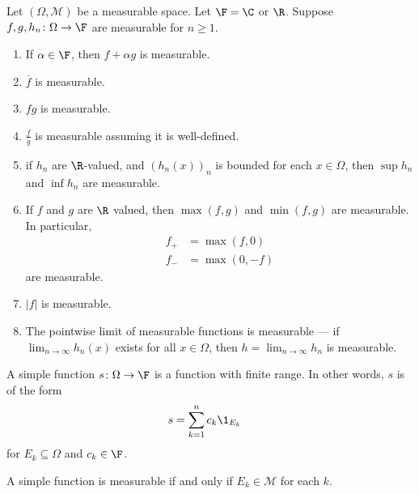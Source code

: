 \begin{proposition}
  Let $\left(\Omega,\mathcal{M}\right)$ be a measurable space. Let $\F = \C$ or $\R$. Suppose $f,g,h_n\colon \Omega\rightarrow \F$ are measurable for $n\geq 1$.
  \begin{enumerate}[(1)]
    \item If $\alpha \in \F$, then $f + \alpha g$ is measurable.
    \item $\overline{f}$ is measurable.
    \item $fg$ is measurable.
    \item $\frac{f}{g}$ is measurable assuming it is well-defined.
    \item if $h_n$ are $\R$-valued, and $\left(h_n\left(x\right)\right)_n$ is bounded for each $x\in \Omega$, then $\sup h_n$ and $\inf h_n$ are measurable.
    \item If $f$ and $g$ are $\R$ valued, then $\max\left(f,g\right)$ and $\min\left(f,g\right)$ are measurable. In particular,
      \begin{align*}
        f_{+} &= \max\left(f,0\right)\\
        f_{-} &= \max\left(0,-f\right)
      \end{align*}
      are measurable.
    \item $\left\vert f \right\vert$ is measurable.
    \item The pointwise limit of measurable functions is measurable --- if $\lim_{n\rightarrow\infty}h_n\left(x\right)$ exists for all $x\in \Omega$, then $h = \lim_{n\rightarrow\infty}h_n$ is measurable.
  \end{enumerate}
\end{proposition}
\begin{definition}
  A simple function $s\colon \Omega\rightarrow \F$ is a function with finite range. In other words, $s$ is of the form
  \begin{align*}
    s &= \sum_{k=1}^{n}c_k\1_{E_k}
  \end{align*}
  for $E_k\subseteq \Omega$ and $c_k\in \F$.\newline

  A simple function is measurable if and only if $E_k\in \mathcal{M}$ for each $k$.
\end{definition}

